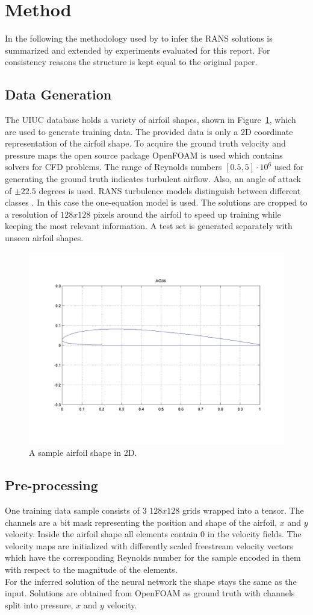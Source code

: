 \documentclass[acmtog]{techreportacmart}
\begin{document}
\section{Method}
In the following the methodology used by \cite{Thuerey20} to infer the RANS solutions is summarized and 
extended by experiments evaluated for this report. For consistency reasons the structure is kept equal to the original paper.

\subsection{Data Generation}
The UIUC database \cite{airfoil} holds a variety of airfoil shapes, shown in Figure~\ref{fig:one}, which 
are used to generate training data. The provided data is only a 2D coordinate representation of the 
airfoil shape. To acquire the ground truth velocity and pressure maps the open source package OpenFOAM is 
used which contains solvers for CFD problems. The range of Reynolds numbers $[0.5, 5] \cdot 10^{6}$ used 
for generating the ground truth indicates turbulent airflow. Also, an angle of attack of $\pm 22.5$ degrees 
is used. RANS turbulence models distinguish between different classes \cite{Alfonsi}. In this case the 
one-equation model is used. The solutions are cropped to a resolution of $128x128$ pixels around the 
airfoil to speed up training while keeping the most relevant information. 
A test set is generated separately with unseen airfoil shapes.

\begin{figure}[h]
  \includegraphics[width=.4\textwidth]{figures/uiuc_sample}
  \vspace*{-10mm}
  \caption{A sample airfoil shape in 2D.}
  \label{fig:one}
\end{figure}

\subsection{Pre-processing}
One training data sample consists of $3$ $128x128$ grids wrapped into a tensor. The channels are a bit 
mask representing the position and shape of the airfoil, $x$ and $y$ velocity. Inside the airfoil shape 
all elements contain $0$ in the velocity fields. The velocity maps are initialized with differently 
scaled freestream velocity vectors which have the corresponding Reynolds number for the sample encoded 
in them with respect to the magnitude of the elements. \\For the inferred solution of the neural network 
the shape stays the same as the input. Solutions are obtained from OpenFOAM as ground 
truth with channels split into pressure, $x$ and $y$ velocity.
\end{document}
